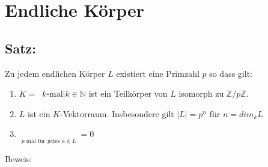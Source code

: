 \section{Endliche Körper}
%
%
%
\subsection{Satz:}
Zu jedem endlichen Körper $L$ existiert eine Primzahl $p$ so dass gilt:
\begin{enumerate}[label={(\alph*)}]
	\item $K = \mathop{\underbrace{\{1+1+ \dotsc +1\}}}\limits{k\text{-mal}}|k \in \mathbb{N}$ ist ein Teilkörper von $L$ 
		isomorph zu $\mathbb{Z}/p\mathbb{Z}$.
	\item $L$ ist ein $K$-Vektorraum. Insbesondere gilt $|L| = p^{n}$ für $n = dim_{k}L$
	\item $\mathop{\underbrace{a+ \dotsc +a}}\limits_{p\text{ mal für jedes } a \in L} = 0$
\end{enumerate}
Beweis:
